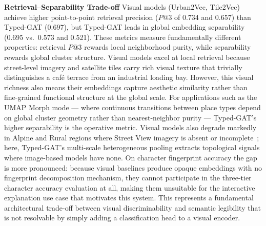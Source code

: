 \documentclass[]{interact}
\theoremstyle{plain}%
\theoremstyle{definition}
\theoremstyle{remark}
\begin{document}
\textbf{Retrieval--Separability Trade-off} Visual models (Urban2Vec, Tile2Vec) achieve higher point-to-point retrieval precision ($P@3$ of 0.734 and 0.657) than Typed-GAT (0.697), but Typed-GAT leads in global embedding separability (0.695 vs.\ 0.573 and 0.521). These metrics measure fundamentally different properties: retrieval $P@3$ rewards local neighborhood purity, while separability rewards global cluster structure. Visual models excel at local retrieval because street-level imagery and satellite tiles carry rich visual texture that trivially distinguishes a café terrace from an industrial loading bay. However, this visual richness also means their embeddings capture aesthetic similarity rather than fine-grained functional structure at the global scale. For applications such as the UMAP Morph mode --- where continuous transitions between place types depend on global cluster geometry rather than nearest-neighbor purity --- Typed-GAT's higher separability is the operative metric. Visual models also degrade markedly in Alpine and Rural regions where Street View imagery is absent or incomplete~\citep{Fonte-2017}; here, Typed-GAT's multi-scale heterogeneous pooling extracts topological signals where image-based models have none. On character fingerprint accuracy the gap is more pronounced: because visual baselines produce opaque embeddings with no fingerprint decomposition mechanism, they cannot participate in the three-tier character accuracy evaluation at all, making them unsuitable for the interactive explanation use case that motivates this system. This represents a fundamental architectural trade-off between visual discriminability and semantic legibility that is not resolvable by simply adding a classification head to a visual encoder.
\end{document}
